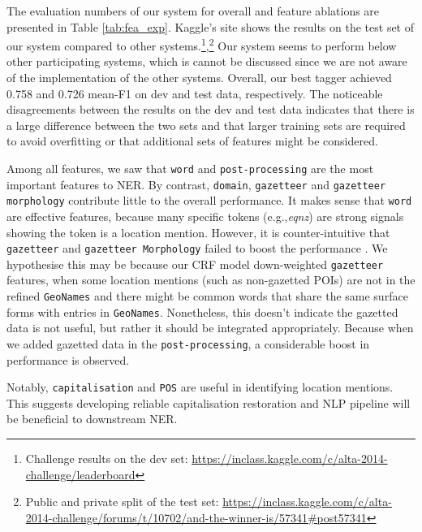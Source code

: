 \documentclass[11pt]{article}
\newcommand{\eg}{e.g.,\xspace}
\newcommand{\geoname}{\texttt{GeoNames}\xspace}
\newcommand{\myex}[1]{\textit{#1}}
\newcommand{\feature}[1]{\texttt{#1}\xspace}
\newcommand{\myurl}[1]{{\footnotesize\url{#1}}}
\newcommand{\tabref}[2][]{Table#1 \ref{#2}}
\begin{document}
The evaluation numbers of our system for overall and feature ablations are presented in \tabref{tab:fea_exp}.
Kaggle's site shows the results on the test set of our system compared to other systems.\footnote{Challenge results on the dev set: \myurl{https://inclass.kaggle.com/c/alta-2014-challenge/leaderboard}},\footnote{Public and private split of the test set: \myurl{https://inclass.kaggle.com/c/alta-2014-challenge/forums/t/10702/and-the-winner-is/57341#post57341}}
Our system seems to perform below other participating systems, which is cannot be discussed since we are not aware of the implementation of the other systems.
Overall, our best tagger achieved 0.758 and 0.726 mean-F1 on dev and test data, respectively.
The noticeable disagreements between the results on the dev and test data indicates that there is a large difference between the two sets and that larger training sets are required to avoid overfitting or that additional sets of features might be considered.

Among all features, we saw that \feature{word} and \feature{post-processing} are the most important features to NER.
By contrast, \feature{domain}, \feature{gazetteer} and \feature{gazetteer morphology} contribute little to the overall performance.
It makes sense that \feature{word} are effective features, because many specific tokens (\eg \myex{eqnz}) are strong signals showing the token is a location mention.
However, it is counter-intuitive that \feature{gazetteer} and \feature{gazetteer Morphology} failed to boost the performance \cite{conll09rati,acl11liux}.
We hypothesise this may be because our CRF model down-weighted \feature{gazetteer} features, when some location mentions (such as non-gazetted POIs) are not in the refined \geoname and there might be common words that share the same surface forms with entries in \geoname.
Nonetheless, this doesn't indicate the gazetted data is not useful, but rather it should be integrated appropriately.
Because when we added gazetted data in the \feature{post-processing}, a considerable boost in performance is observed.

Notably, \feature{capitalisation} and \feature{POS} are useful in identifying location mentions.
This suggests developing reliable capitalisation restoration and NLP pipeline will be beneficial to downstream NER.
\end{document}
